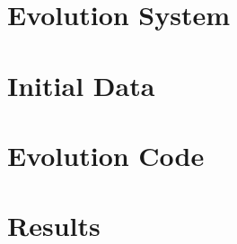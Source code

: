 

\section{Evolution System}
\label{ch:wave_scattering:sec:system}


\section{Initial Data}
\label{ch:wave_scattering:sec:id}


\section{Evolution Code}
\label{ch:wave_scattering:sec:code}


\section{Results}
\label{ch:wave_scattering:sec:results}
